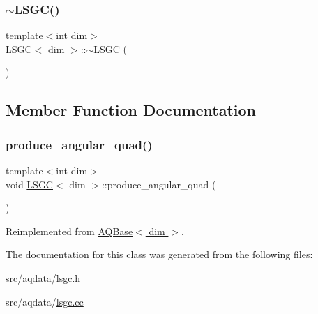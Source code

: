 \mbox{\label{class_l_s_g_c_abcba8afdb075485278288db321776b7e}} 
\subsubsection{\texorpdfstring{$\sim$\+L\+S\+G\+C()}{~LSGC()}}
{\footnotesize\ttfamily template$<$int dim$>$ \\
\hyperlink{class_l_s_g_c}{L\+S\+GC}$<$ dim $>$\+::$\sim$\hyperlink{class_l_s_g_c}{L\+S\+GC} (\begin{DoxyParamCaption}{ }\end{DoxyParamCaption})}



\subsection{Member Function Documentation}
\mbox{\label{class_l_s_g_c_a1d135fb9ca12a9b65b8cc397479fc4d7}} 
\subsubsection{\texorpdfstring{produce\+\_\+angular\+\_\+quad()}{produce\_angular\_quad()}}
{\footnotesize\ttfamily template$<$int dim$>$ \\
void \hyperlink{class_l_s_g_c}{L\+S\+GC}$<$ dim $>$\+::produce\+\_\+angular\+\_\+quad (\begin{DoxyParamCaption}{ }\end{DoxyParamCaption})\hspace{0.3cm}{\ttfamily [virtual]}}



Reimplemented from \hyperlink{class_a_q_base_a16c7871be0da6c112f547f39d50258fd}{A\+Q\+Base$<$ dim $>$}.



The documentation for this class was generated from the following files\+:\begin{DoxyCompactItemize}
\item 
src/aqdata/\hyperlink{lsgc_8h}{lsgc.\+h}\item 
src/aqdata/\hyperlink{lsgc_8cc}{lsgc.\+cc}\end{DoxyCompactItemize}
